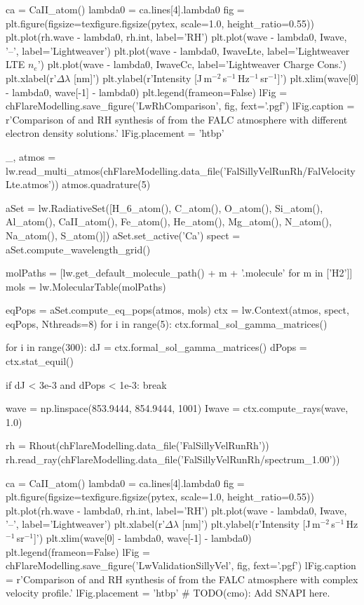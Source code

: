 \begin{pycode}[FlareModelling]
ca = CaII_atom()
lambda0 = ca.lines[4].lambda0
fig = plt.figure(figsize=texfigure.figsize(pytex, scale=1.0, height_ratio=0.55))
plt.plot(rh.wave - lambda0, rh.int, label='RH')
plt.plot(wave - lambda0, Iwave, '--', label='Lightweaver')
plt.plot(wave - lambda0, IwaveLte, label='Lightweaver LTE $n_e$')
plt.plot(wave - lambda0, IwaveCc, label='Lightweaver Charge Cons.')
plt.xlabel(r'$\Delta\lambda$ [nm]')
plt.ylabel(r'Intensity [J\,m$^{-2}$\,s$^{-1}$\,Hz$^{-1}$\,sr$^{-1}$]')
plt.xlim(wave[0] - lambda0, wave[-1] - lambda0)
plt.legend(frameon=False)
lFig = chFlareModelling.save_figure('LwRhComparison', fig, fext='.pgf')
lFig.caption = r'Comparison of \Lw{} and RH synthesis of \CaLine{} from the FALC atmosphere with different electron density solutions.'
lFig.placement = 'htbp'
\end{pycode}
\begin{pycode}[FlareModelling]

_, atmos = lw.read_multi_atmos(chFlareModelling.data_file('FalSillyVelRunRh/FalVelocityLte.atmos'))
atmos.quadrature(5)

aSet = lw.RadiativeSet([H_6_atom(), C_atom(), O_atom(), Si_atom(), Al_atom(),
                        CaII_atom(), Fe_atom(), He_atom(), Mg_atom(), N_atom(),
                        Na_atom(), S_atom()])
aSet.set_active('Ca')
spect = aSet.compute_wavelength_grid()

molPaths = [lw.get_default_molecule_path() + m + '.molecule' for m in ['H2']]
mols = lw.MolecularTable(molPaths)

eqPops = aSet.compute_eq_pops(atmos, mols)
ctx = lw.Context(atmos, spect, eqPops, Nthreads=8)
for i in range(5):
    ctx.formal_sol_gamma_matrices()

for i in range(300):
    dJ = ctx.formal_sol_gamma_matrices()
    dPops = ctx.stat_equil()

    if dJ < 3e-3 and dPops < 1e-3:
        break

wave = np.linspace(853.9444, 854.9444, 1001)
Iwave = ctx.compute_rays(wave, 1.0)

rh = Rhout(chFlareModelling.data_file('FalSillyVelRunRh'))
rh.read_ray(chFlareModelling.data_file('FalSillyVelRunRh/spectrum_1.00'))

ca = CaII_atom()
lambda0 = ca.lines[4].lambda0
fig = plt.figure(figsize=texfigure.figsize(pytex, scale=1.0, height_ratio=0.55))
plt.plot(rh.wave - lambda0, rh.int, label='RH')
plt.plot(wave - lambda0, Iwave, '--', label='Lightweaver')
plt.xlabel(r'$\Delta\lambda$ [nm]')
plt.ylabel(r'Intensity [J\,m$^{-2}$\,s$^{-1}$\,Hz$^{-1}$\,sr$^{-1}$]')
plt.xlim(wave[0] - lambda0, wave[-1] - lambda0)
plt.legend(frameon=False)
lFig = chFlareModelling.save_figure('LwValidationSillyVel', fig, fext='.pgf')
lFig.caption = r'Comparison of \Lw{} and RH synthesis of \CaLine{} from the FALC atmosphere with complex velocity profile.'
lFig.placement = 'htbp'
# TODO(cmo): Add SNAPI here.
\end{pycode}
